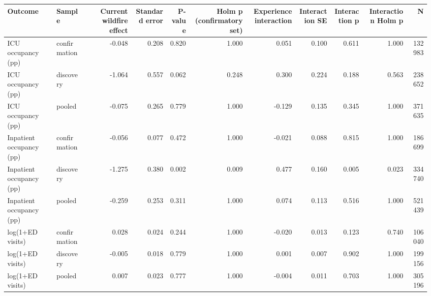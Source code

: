 \begin{tabular}{llrrrrrrrrr}
\toprule
Outcome & Sample & Current wildfire effect & Standard error & P-value & Holm p (confirmatory set) & Experience interaction & Interaction SE & Interaction p & Interaction Holm p & N \\
\midrule
ICU occupancy (pp) & confirmation & -0.048 & 0.208 & 0.820 & 1.000 & 0.051 & 0.100 & 0.611 & 1.000 & 132983 \\
ICU occupancy (pp) & discovery & -1.064 & 0.557 & 0.062 & 0.248 & 0.300 & 0.224 & 0.188 & 0.563 & 238652 \\
ICU occupancy (pp) & pooled & -0.075 & 0.265 & 0.779 & 1.000 & -0.129 & 0.135 & 0.345 & 1.000 & 371635 \\
Inpatient occupancy (pp) & confirmation & -0.056 & 0.077 & 0.472 & 1.000 & -0.021 & 0.088 & 0.815 & 1.000 & 186699 \\
Inpatient occupancy (pp) & discovery & -1.275 & 0.380 & 0.002 & 0.009 & 0.477 & 0.160 & 0.005 & 0.023 & 334740 \\
Inpatient occupancy (pp) & pooled & -0.259 & 0.253 & 0.311 & 1.000 & 0.074 & 0.113 & 0.516 & 1.000 & 521439 \\
log(1+ED visits) & confirmation & 0.028 & 0.024 & 0.244 & 1.000 & -0.020 & 0.013 & 0.123 & 0.740 & 106040 \\
log(1+ED visits) & discovery & -0.005 & 0.018 & 0.779 & 1.000 & 0.001 & 0.007 & 0.902 & 1.000 & 199156 \\
log(1+ED visits) & pooled & 0.007 & 0.023 & 0.777 & 1.000 & -0.004 & 0.011 & 0.703 & 1.000 & 305196 \\
\bottomrule
\end{tabular}
